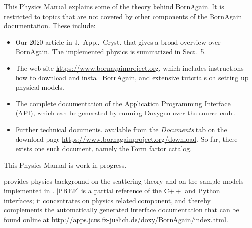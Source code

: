 This Physics Manual explains some of the theory behind BornAgain.
It is restricted to topics that are not covered by other components
of the BornAgain documentation.
These include:
\begin{itemize}
\item Our 2020 article in J.~Appl.\ Cryst. \cite{PoVB20}
that gives a broad overview over BornAgain.
The implemented physics is summarized in Sect.~5.
\item {}
The web site \url{https://www.bornagainproject.org},
which includes instructions how to download and install BornAgain,
and extensive tutorials on setting up physical models.
\item {}
The complete documentation of the Application Programming Interface (API),
which can be generated by running 
Doxygen over the source code.
\item Further technical documents,
available from the \emph{Documents} tab on the download page
\url{https://www.bornagainproject.org/download}.
So far, there exists one such document, namely the
\href{http://apps.jcns.fz-juelich.de/src/BornAgain/FFCatalog.pdf}{Form factor catalog}.
\end{itemize}
This Physics Manual is work in progress.

 provides physics background
on the scattering theory and on the sample models implemented in \BornAgain.
\cref{PREF} is a partial reference of the C$++$ and Python interfaces;
it concentrates on physics related component,
and thereby complements the automatically generated interface documentation
that can be found online at \url{http://apps.jcns.fz-juelich.de/doxy/BornAgain/index.html}.



